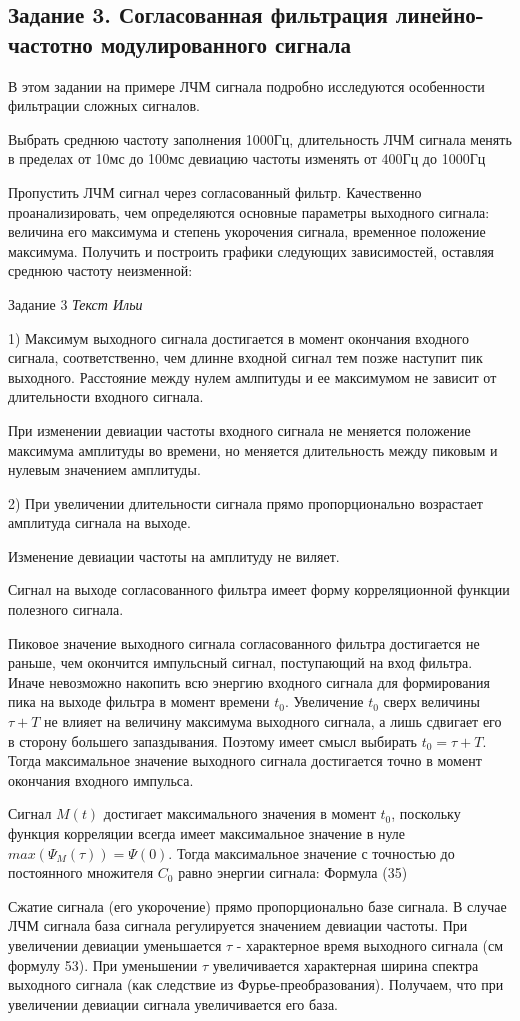 \subsection{Задание 3. Согласованная фильтрация линейно-частотно
модулированного сигнала}
В этом задании на примере ЛЧМ сигнала подробно исследуются
особенности фильтрации сложных сигналов. 

Выбрать среднюю частоту заполнения 1000Гц,
длительность ЛЧМ сигнала менять в пределах от 10мс до 100мс
девиацию частоты изменять от 400Гц до 1000Гц 

Пропустить ЛЧМ сигнал через согласованный фильтр. Качественно
проанализировать, чем определяются основные параметры выходного сигнала:
величина его максимума и степень укорочения сигнала, временное положение
максимума. Получить и построить графики следующих зависимостей, оставляя
среднюю частоту неизменной:

Задание 3
\textit{Текст Ильи}

1) Максимум выходного сигнала достигается в момент окончания входного сигнала, соответственно,
чем длинне входной сигнал тем позже наступит пик выходного.  Расстояние между нулем амлпитуды
и ее максимумом не зависит от длительности входного сигнала. 

При изменении девиации частоты входного сигнала не меняется положение максимума амплитуды
во времени, но меняется длительность между пиковым и нулевым значением амплитуды.

2) При увеличении длительности сигнала прямо пропорционально возрастает амплитуда сигнала на выходе.

Изменение девиации частоты на амплитуду не виляет.



Сигнал на выходе согласованного фильтра имеет форму корреляционной функции
полезного сигнала. 

Пиковое значение выходного сигнала согласованного фильтра достигается не раньше, чем окончится
импульсный сигнал, поступающий на вход фильтра. Иначе невозможно накопить всю энергию входного
сигнала для формирования пика на выходе фильтра в момент времени $t_0$. Увеличение $t_0$ сверх
величины $\tau + T$ не влияет на величину максимума выходного сигнала, а лишь сдвигает его в
сторону большего запаздывания. Поэтому имеет смысл выбирать $t_0 = \tau + T$. Тогда максимальное
значение выходного сигнала достигается точно в момент окончания входного импульса.

Сигнал $M(t)$ достигает максимального значения в момент $t_0$, поскольку функция корреляции
всегда имеет максимальное значение в нуле $max(\Psi_M(\tau))=\Psi(0)$. Тогда максимальное значение с
точностью до постоянного множителя $C_0$ равно энергии сигнала: Формула (35)

Сжатие сигнала (его укорочение) прямо пропорционально базе сигнала. В случае ЛЧМ
сигнала база сигнала регулируется значением девиации частоты.  При увеличении девиации
уменьшается $\tau$ - характерное время выходного сигнала (см формулу 53). При уменьшении
$\tau$ увеличивается характерная ширина спектра выходного сигнала (как следствие из
Фурье-преобразования). Получаем, что при увеличении девиации сигнала увеличивается его база. 



